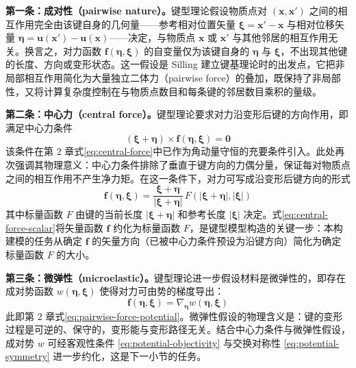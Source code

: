 \textbf{第一条：成对性（pairwise nature）。}键型理论假设物质点对 $(\mathbf{x},\mathbf{x}')$ 之间的相互作用完全由该键自身的几何量——参考相对位置矢量 $\boldsymbol{\xi}=\mathbf{x}'-\mathbf{x}$ 与相对位移矢量 $\boldsymbol{\eta}=\mathbf{u}(\mathbf{x}')-\mathbf{u}(\mathbf{x})$——决定，与物质点 $\mathbf{x}$ 或 $\mathbf{x}'$ 与其他邻居的相互作用无关。换言之，对力函数 $\mathbf{f}(\boldsymbol{\eta},\boldsymbol{\xi})$ 的自变量仅为该键自身的 $\boldsymbol{\eta}$ 与 $\boldsymbol{\xi}$，不出现其他键的长度、方向或变形状态。这一假设是 Silling \cite{Silling2000} 建立键基理论时的出发点，它把非局部相互作用简化为大量独立二体力（pairwise force）的叠加，既保持了非局部性，又将计算复杂度控制在与物质点数目和每条键的邻居数目乘积的量级。

\textbf{第二条：中心力（central force）。}键型理论要求对力沿变形后键的方向作用，即满足中心力条件
\begin{equation}
(\boldsymbol{\xi}+\boldsymbol{\eta})\times\mathbf{f}(\boldsymbol{\eta},\boldsymbol{\xi})=\mathbf{0}
\label{eq:central-force-recall}
\end{equation}
该条件在第 2 章式\eqref{eq:central-force}中已作为角动量守恒的充要条件引入。此处再次强调其物理意义：中心力条件排除了垂直于键方向的力偶分量，保证每对物质点之间的相互作用不产生净力矩。在这一条件下，对力可写成沿变形后键方向的形式
\begin{equation}
\mathbf{f}(\boldsymbol{\eta},\boldsymbol{\xi}) = \frac{\boldsymbol{\xi}+\boldsymbol{\eta}}{|\boldsymbol{\xi}+\boldsymbol{\eta}|}\,F(|\boldsymbol{\xi}+\boldsymbol{\eta}|,|\boldsymbol{\xi}|)
\label{eq:central-force-scalar}
\end{equation}
其中标量函数 $F$ 由键的当前长度 $|\boldsymbol{\xi}+\boldsymbol{\eta}|$ 和参考长度 $|\boldsymbol{\xi}|$ 决定。式\eqref{eq:central-force-scalar}将矢量函数 $\mathbf{f}$ 约化为标量函数 $F$，是键型模型构造的关键一步：本构建模的任务从确定 $\mathbf{f}$ 的矢量方向（已被中心力条件预设为沿键方向）简化为确定标量函数 $F$ 的大小。

\textbf{第三条：微弹性（microelastic）。}键型理论进一步假设材料是微弹性的，即存在成对势函数 $w(\boldsymbol{\eta},\boldsymbol{\xi})$ 使得对力可由势的梯度导出：
\begin{equation}
\mathbf{f}(\boldsymbol{\eta},\boldsymbol{\xi}) = \nabla_{\boldsymbol{\eta}} w(\boldsymbol{\eta},\boldsymbol{\xi})
\label{eq:pairwise-force-potential-recall}
\end{equation}
此即第 2 章式\eqref{eq:pairwise-force-potential}。微弹性假设的物理含义是：键的变形过程是可逆的、保守的，变形能与变形路径无关。结合中心力条件与微弹性假设，成对势 $w$ 可经客观性条件 \eqref{eq:potential-objectivity} 与交换对称性 \eqref{eq:potential-symmetry} 进一步约化，这是下一小节的任务。

